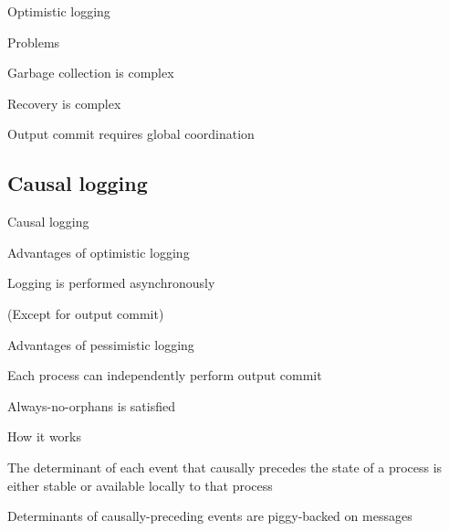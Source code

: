 \begin{frame}{Optimistic logging}
\BI
\item Problems
\BI
	\item Garbage collection is complex
	\item Recovery is complex
	\item Output commit requires global coordination
\EI
\EI
\end{frame}

\subsection{Causal logging}

\begin{frame}{Causal logging}
\BIL
\item Advantages of optimistic logging
	\BI
	\item Logging is performed asynchronously
	\item (Except for output commit)
	\EI
\item Advantages of pessimistic logging
	\BI
	\item Each process can independently perform output commit
	\item Always-no-orphans is satisfied
	\EI
\item How it works
	\BI
	\item The determinant of each event that causally precedes the state of a process is either stable or available locally to that process
	\item Determinants of causally-preceding events are piggy-backed on messages
	\EI
\EIL
\end{frame}


